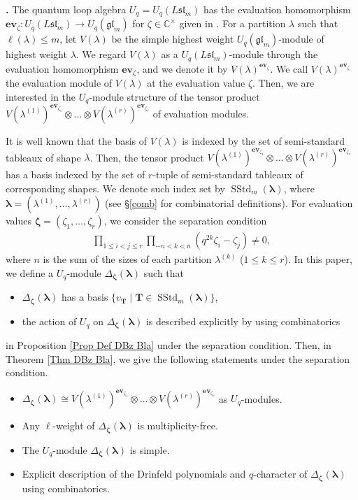 \documentclass[12pt]{amsart}
\def \para{\refstepcounter{thm} \par\medskip\noindent
                \textbf{\thethm .} }
\numberwithin{equation}{thm}
\newcommand\CC{\mathbb C}
\newcommand\bT{\mathbf T}
\newcommand\z{\zeta}
\newcommand\la{\lambda}
\newcommand\D{\Delta}
\newcommand\Bz{\boldsymbol\zeta}
\newcommand\Bla{\boldsymbol\lambda}
\newcommand\ra{\rightarrow}
\newcommand\Fgl{\mathfrak{gl}}
\newcommand\Fsl{\mathfrak{sl}}
\newcommand\ev{\mathbf{{ev}}}
\newcommand{\SStd}{\operatorname{SStd}}
\newcounter{ni}
\begin{document}
\para 
The quantum loop algebra $U_q=U_q (L\Fsl_m)$ has the evaluation homomorphism 
$\ev_{\z} : U_q(L\Fsl_m) \ra U_q (\Fgl_m)$ for $\z \in \CC^{\times}$ 
given in \cite{Jim86}. 
For a partition $\la$ such that $\ell (\la) \leq m$, 
let $V(\la)$ be the simple highest weight $U_q(\Fgl_m)$-module of highest weight $\la$. 
We regard $V(\la)$ as a $U_q (L\Fsl_m)$-module through the evaluation homomorphism $\ev_{\z}$, 
and we denote it by $V(\la)^{\ev_\z}$. 
We call $V(\la)^{\ev_\z}$ the evaluation module of $V(\la)$ at the evaluation value $\z$. 
Then, we are interested in the $U_q$-module structure of the tensor product 
$V(\la^{(1)})^{\ev_{\z_1}} \otimes \dots \otimes V(\la^{(r)})^{\ev_{\z_r}}$ of evaluation modules. 

It is well known that the basis of  $V(\la)$ 
is indexed by the set of semi-standard tableaux of shape $\la$. 
Then, the tensor product $V(\la^{(1)})^{\ev_{\z_1}} \otimes \dots \otimes V(\la^{(r)})^{\ev_{\z_r}}$ 
has a basis indexed by the set of $r$-tuple of semi-standard tableaux of corresponding shapes. 
We denote such index set by $\SStd_m(\Bla)$, 
where $\Bla = (\la^{(1)}, \dots, \la^{(r)})$ 
(see \S \ref{comb} for combinatorial definitions).  
For evaluation values $\Bz=(\z_1,\dots, \z_r)$, 
we consider  
the separation condition 
\begin{align*}
\prod_{1 \leq i < j \leq r} \prod_{- n < k <n} (q^{2k} \z_i - \z_j) \not=0, 
\end{align*}  
where $n$ is the sum of the sizes of each partition $\la^{(k)}$ ($1 \leq k \leq r$). 
In this paper, 
we define a $U_q$-module $\D_{\Bz} (\Bla)$ such that 
\begin{itemize}
\item $\D_{\Bz} (\Bla)$ has a basis $\{ v_{\bT} \mid \bT \in \SStd_m (\Bla) \}$, 

\item the action of $U_q$ on $\D_{\Bz}(\Bla)$ is described explicitly by using combinatorics 
\end{itemize}
in Proposition \ref{Prop Def DBz Bla} 
under the separation condition. 
Then, in Theorem \ref{Thm DBz Bla}, we give the following statements under the separation condition.
\begin{itemize}
\item $\D_{\Bz} (\Bla) \cong V(\la^{(1)})^{\ev_{\z_1}} \otimes \dots \otimes V(\la^{(r)})^{\ev_{\z_r}}$ 
	as $U_q$-modules. 

\item Any $\ell$-weight of $\D_{\Bz}(\Bla)$ is multiplicity-free. 

\item The $U_q$-module $\D_{\Bz} (\Bla)$ is simple. 

\item Explicit description of the Drinfeld polynomials and $q$-character of $\D_{\Bz} (\Bla)$ 
	using combinatorics. 
\end{itemize}
\end{document}
